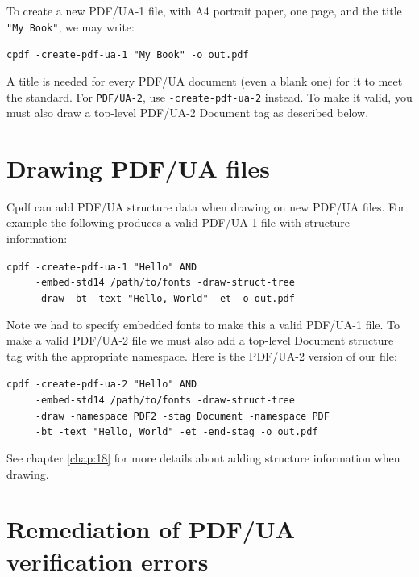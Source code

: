 \documentclass{book}
\begin{document}
To create a new PDF/UA-1 file, with A4 portrait paper, one page, and the title \texttt{"My Book"}, we may write:

  \begin{framed}
    \noindent\small\verb!cpdf -create-pdf-ua-1 "My Book" -o out.pdf!
  \end{framed}

\noindent A title is needed for every PDF/UA document (even a blank one) for it to meet the standard. For \texttt{PDF/UA-2}, use \texttt{-create-pdf-ua-2} instead. To make it valid, you must also draw a top-level PDF/UA-2 Document tag as described below.

\section{Drawing PDF/UA files}

Cpdf can add PDF/UA structure data when drawing on new PDF/UA files. For example the following produces a valid PDF/UA-1 file with structure information:

\begin{framed}
   \noindent\small\verb!cpdf -create-pdf-ua-1 "Hello" AND!\\
   \noindent\small\verb!     -embed-std14 /path/to/fonts -draw-struct-tree!\\
   \noindent\small\verb!     -draw -bt -text "Hello, World" -et -o out.pdf!
\end{framed}

\noindent Note we had to specify embedded fonts to make this a valid PDF/UA-1 file. To make a valid PDF/UA-2 file we must also add a top-level Document structure tag with the appropriate namespace. Here is the PDF/UA-2 version of our file:

\begin{framed}
   \noindent\small\verb!cpdf -create-pdf-ua-2 "Hello" AND !\\
   \noindent\small\verb!     -embed-std14 /path/to/fonts -draw-struct-tree!\\
   \noindent\small\verb!     -draw -namespace PDF2 -stag Document -namespace PDF!\\
   \noindent\small\verb!     -bt -text "Hello, World" -et -end-stag -o out.pdf!
\end{framed}

\noindent See chapter \ref{chap:18} for more details about adding structure information when drawing.

\section{Remediation of PDF/UA verification errors}
\end{document}
